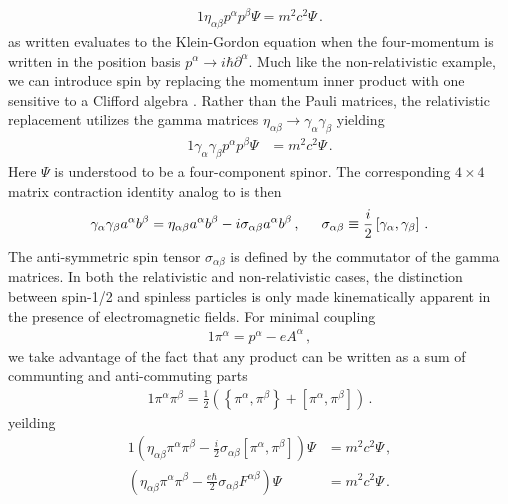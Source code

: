 \begin{alignat}{1}
	\label{eq:spin:02} \eta_{\alpha\beta}p^{\alpha}p^{\beta}\Psi=m^{2}c^{2}\Psi\,.
\end{alignat}
 as written evaluates to the Klein-Gordon equation when the four-momentum is written in the position basis $p^{\alpha}\rightarrow i\hbar\partial^{\alpha}$. Much like the non-relativistic example, we can introduce spin by replacing the momentum inner product with one sensitive to a Clifford algebra \cite{Weinberg:1995mt}. Rather than the Pauli matrices, the relativistic replacement utilizes the gamma matrices $\eta_{\alpha\beta}\rightarrow\gamma_{\alpha}\gamma_{\beta}$ yielding
\begin{alignat}{1}
	\label{eq:spin:03} \gamma_{\alpha}\gamma_{\beta}p^{\alpha}p^{\beta}\Psi&=m^{2}c^{2}\Psi\,.
\end{alignat}
Here $\Psi$ is understood to be a four-component spinor. The corresponding $4\times4$ matrix contraction identity analog to  is then
\begin{alignat}{1}
	\label{eq:spin:04} \gamma_{\alpha}\gamma_{\beta}a^{\alpha}b^{\beta}=\eta_{\alpha\beta}a^{\alpha}b^{\beta}-i\sigma_{\alpha\beta}a^{\alpha}b^{\beta}\,,\indent \sigma_{\alpha\beta}\equiv\frac{i}{2}\left[\gamma_{\alpha},\gamma_{\beta}\right]\,.
\end{alignat}
The anti-symmetric spin tensor $\sigma_{\alpha\beta}$ is defined by the commutator of the gamma matrices. In both the relativistic and non-relativistic cases, the distinction between spin-1/2 and spinless particles is only made kinematically apparent in the presence of electromagnetic fields. For minimal coupling
\begin{alignat}{1}
  \label{eq:spin:05} \pi^{\alpha}=p^{\alpha}-eA^{\alpha}\,,
\end{alignat}
we take advantage of the fact that any product can be written as a sum of communting and anti-commuting parts
\begin{alignat}{1}
	\label{eq:spin:06} \pi^{\alpha}\pi^{\beta}=\frac{1}{2}\left(\left\{\pi^{\alpha},\pi^{\beta}\right\}+\left[\pi^{\alpha},\pi^{\beta}\right]\right)\,.
\end{alignat}
yeilding
\begin{alignat}{1}
	\label{eq:spin:07a} \left(\eta_{\alpha\beta}\pi^{\alpha}\pi^{\beta}-\frac{i}{2}\sigma_{\alpha\beta}\left[\pi^{\alpha},\pi^{\beta}\right]\right)\Psi&=m^{2}c^{2}\Psi\,,\\
	\label{eq:spin:07b} \left(\eta_{\alpha\beta}\pi^{\alpha}\pi^{\beta}-\frac{e\hbar}{2}\sigma_{\alpha\beta}F^{\alpha\beta}\right)\Psi&=m^{2}c^{2}\Psi\,.
\end{alignat}

